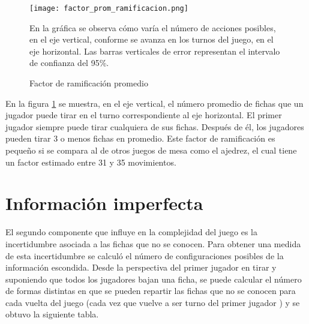 \begin{figure}[ht]
    \begin{center}
        \texttt{[image: factor\_prom\_ramificacion.png]}
        \caption{Factor de ramificación promedio}
        En la gráfica se observa cómo varía el número de acciones posibles, en el
        eje vertical, conforme se avanza en los turnos del juego, en el eje
        horizontal. Las barras verticales de error representan el intervalo de
        confianza del 95\%.
        \label{FPR}
    \end{center}
\end{figure}

En la figura \ref{FPR} se muestra, en el eje vertical, el número promedio de
fichas que un jugador puede tirar en el turno correspondiente al eje horizontal.
El primer jugador siempre puede tirar cualquiera de sus fichas. Después de él,
los jugadores pueden tirar 3 o menos fichas en promedio. Este factor de
ramificación es pequeño si se compara al de otros juegos de mesa como el
ajedrez, el cual tiene un factor estimado entre 31 y 35 movimientos.

\section{Información imperfecta}

El segundo componente que influye en la complejidad del juego es la
incertidumbre asociada a las fichas que no se conocen. Para obtener una medida
de esta incertidumbre se calculó el número de configuraciones posibles de la
información escondida. Desde la perspectiva del primer jugador en tirar y
suponiendo que todos los jugadores bajan una ficha, se puede calcular el número
de formas distintas en que se pueden repartir las fichas que no se conocen para
cada vuelta del juego (cada vez que vuelve a ser turno del primer jugador ) y se
obtuvo la siguiente tabla.


